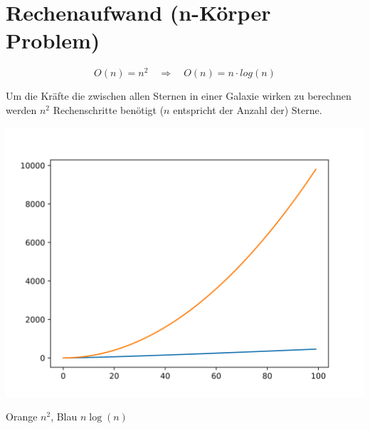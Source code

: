\section*{Rechenaufwand (n-Körper Problem)}

\begin{equation}
  O(n) = n^2 \quad \Rightarrow \quad O(n) = n \cdot log(n)
\end{equation}

Um die Kräfte die zwischen allen Sternen in einer Galaxie wirken zu berechnen
werden \( n^2 \) Rechenschritte benötigt (\( n \) entspricht der Anzahl der)
Sterne.

\vspace{-0.25cm}
\begin{center}
\includegraphics[width=0.8\linewidth]{figs/bigo_large}
\caption{Orange \( n^2 \), Blau \( n \log(n) \)}
\label{fig:bigo}
\end{center}\vspace{-1.25cm}
